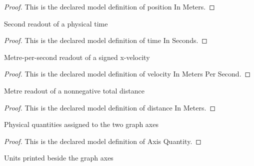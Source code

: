 \begin{proof}
  This is the declared model definition of position In Meters.
\end{proof}
\begin{definition}
  \label{def:physics:phyx-mini-0672:phyxminiproblems-problemphyxmini0672-timeinseconds}
  Second readout of a physical time
\end{definition}
\begin{proof}
  This is the declared model definition of time In Seconds.
\end{proof}
\begin{definition}
  \label{def:physics:phyx-mini-0672:phyxminiproblems-problemphyxmini0672-velocityinmeterspersecond}
  Metre-per-second readout of a signed x-velocity
\end{definition}
\begin{proof}
  This is the declared model definition of velocity In Meters Per Second.
\end{proof}
\begin{definition}
  \label{def:physics:phyx-mini-0672:phyxminiproblems-problemphyxmini0672-distanceinmeters}
  Metre readout of a nonnegative total distance
\end{definition}
\begin{proof}
  This is the declared model definition of distance In Meters.
\end{proof}
\begin{definition}
  \label{def:physics:phyx-mini-0672:phyxminiproblems-problemphyxmini0672-axisquantity}
  Physical quantities assigned to the two graph axes
\end{definition}
\begin{proof}
  This is the declared model definition of Axis Quantity.
\end{proof}
\begin{definition}
  \label{def:physics:phyx-mini-0672:phyxminiproblems-problemphyxmini0672-axisunit}
  Units printed beside the graph axes
\end{definition}
